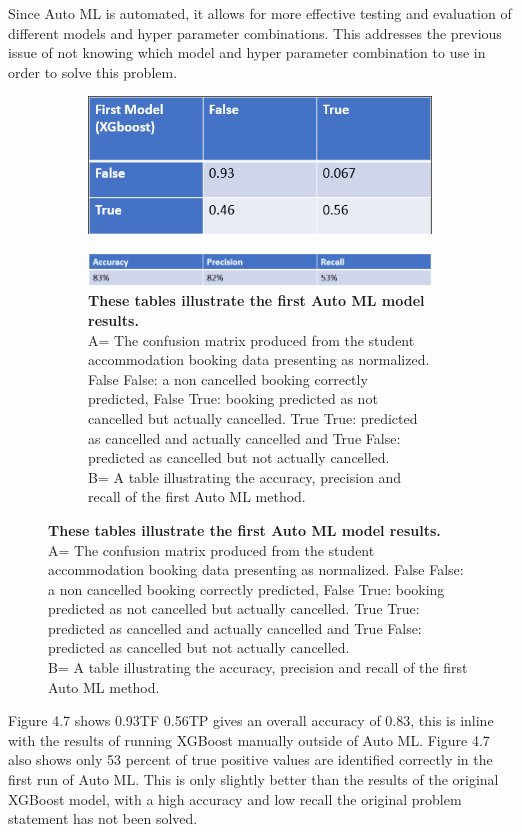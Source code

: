 Since Auto ML is automated, it allows for more effective testing and evaluation of different models and hyper parameter combinations. This addresses the previous issue of not knowing which model and hyper parameter combination to use in order to solve this problem.

 \begin{figure}[H]
 \centering
  \begin{subfigure}{A\textwidth}
    \includegraphics[width=10cm]{figures/xgboost_confusion_matrix.png}
  \end{subfigure}

  \centering
  \begin{subfigure}{B\textwidth}
    \includegraphics[width=10cm]{figures/original_results.png}
    \caption{\textbf{These tables illustrate the first Auto ML model results.}\vspace{2mm} \\ A= The confusion matrix produced from the student accommodation booking data presenting as normalized. False False: a non cancelled booking correctly predicted, False True: booking predicted as not cancelled but actually cancelled. True True: predicted as cancelled and actually cancelled and True False: predicted as cancelled but not actually cancelled. \vspace{2mm} \\B= A table illustrating the accuracy, precision and recall of the first Auto ML method.} \label{fig:1b}
  \end{subfigure}
\end{figure}

Figure 4.7 shows  0.93TF 0.56TP gives an overall accuracy of 0.83, this is inline with the results of running XGBoost manually outside of Auto ML. Figure 4.7 also shows only 53 percent of true positive values are identified correctly in the first run of Auto ML. This is only slightly better than the results of the original XGBoost model, with a high accuracy and low recall the original problem statement has not been solved. 


